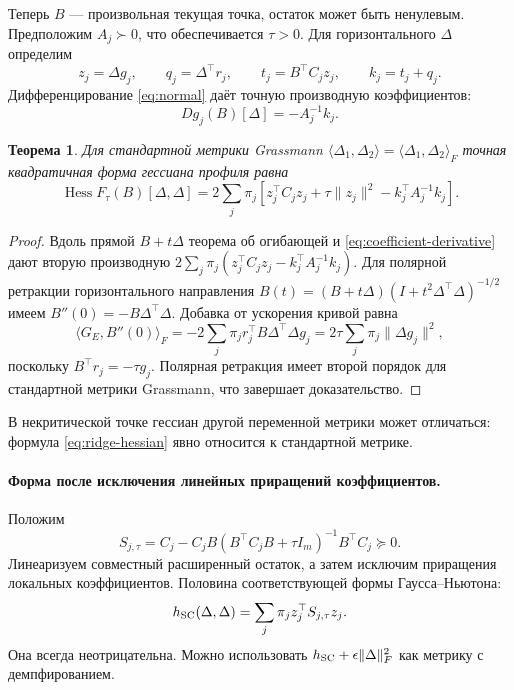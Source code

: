 \documentclass[11pt,a4paper]{article}
\newcommand{\Hess}{\operatorname{Hess}}
\newcommand{\norm}[1]{\lVert#1\rVert}
\newcommand{\inner}[2]{\langle#1,#2\rangle_F}
\newtheorem{theorem}{Теорема}[section]
\theoremstyle{remark}
\begin{document}
Теперь $B$ --- произвольная текущая точка, остаток может быть ненулевым.
Предположим $A_j\succ0$, что обеспечивается $\tau>0$.
Для горизонтального $\Delta$ определим
\begin{equation}\label{eq:hessian-parts}
 z_j=\Delta g_j,\qquad q_j=\Delta^\top r_j,\qquad
 t_j=B^\top C_jz_j,\qquad k_j=t_j+q_j.
\end{equation}
Дифференцирование \eqref{eq:normal} даёт точную производную коэффициентов:
\begin{equation}\label{eq:coefficient-derivative}
 Dg_j(B)[\Delta]=-A_j^{-1}k_j.
\end{equation}

\begin{theorem}\label{th:ridge-hessian}
Для стандартной метрики Grassmann
$\langle\Delta_1,\Delta_2\rangle=\inner{\Delta_1}{\Delta_2}$
точная квадратичная форма гессиана профиля равна
\begin{equation}\label{eq:ridge-hessian}
 \boxed{\displaystyle
 \Hess F_\tau(B)[\Delta,\Delta]
 =2\sum_j\pi_j\left[
 z_j^\top C_jz_j+\tau\norm{z_j}^2-k_j^\top A_j^{-1}k_j
 \right].}
\end{equation}
\end{theorem}
\begin{proof}
Вдоль прямой $B+t\Delta$ теорема об огибающей и
\eqref{eq:coefficient-derivative} дают вторую производную
$2\sum_j\pi_j(z_j^\top C_jz_j-k_j^\top A_j^{-1}k_j)$.
Для полярной ретракции горизонтального направления
$B(t)=(B+t\Delta)(I+t^2\Delta^\top\Delta)^{-1/2}$
имеем $B''(0)=-B\Delta^\top\Delta$.
Добавка от ускорения кривой равна
\[
 \inner{G_E}{B''(0)}
 =-2\sum_j\pi_jr_j^\top B\Delta^\top\Delta g_j
 =2\tau\sum_j\pi_j\norm{\Delta g_j}^2,
\]
поскольку $B^\top r_j=-\tau g_j$.
Полярная ретракция имеет второй порядок для стандартной метрики
Grassmann, что завершает доказательство.
\end{proof}
В некритической точке гессиан другой переменной метрики может отличаться:
формула \eqref{eq:ridge-hessian} явно относится к стандартной метрике.

\paragraph{Форма после исключения линейных приращений коэффициентов.}
Положим
\begin{equation}\label{eq:ridge-schur}
 S_{j,\tau}=C_j-C_jB(B^\top C_jB+\tau I_m)^{-1}B^\top C_j\succeq0.
\end{equation}
Линеаризуем совместный расширенный остаток, а затем исключим приращения
локальных коэффициентов. Половина соответствующей формы Гаусса--Ньютона:
\begin{equation}\label{eq:schur-gn}
 h_{\rm SC}(\Delta,\Delta)
 =\sum_j\pi_j z_j^\top S_{j,\tau}z_j.
\end{equation}
Она всегда неотрицательна. Можно использовать
$h_{\rm SC}+\epsilon\norm{\Delta}_F^2$ как метрику с демпфированием.
\end{document}
